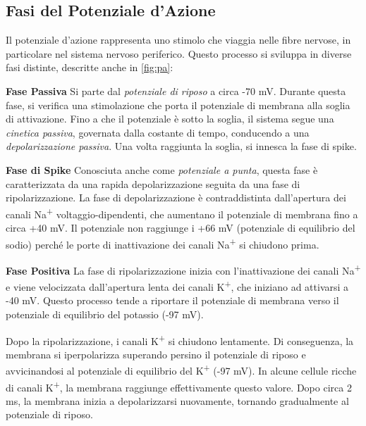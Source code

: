 \subsection{Fasi del Potenziale d’Azione}

Il potenziale d’azione rappresenta uno stimolo che viaggia nelle fibre nervose, in particolare nel sistema nervoso periferico. Questo processo si sviluppa in diverse fasi distinte, descritte anche in \autoref{fig:pa}:

\begin{description}
    \item \textbf{Fase Passiva} Si parte dal \textit{potenziale di riposo} a circa -70 mV. Durante questa fase, si verifica una stimolazione che porta il potenziale di membrana alla soglia di attivazione. Fino a che il potenziale è sotto la soglia, il sistema segue una \textit{cinetica passiva}, governata dalla costante di tempo, conducendo a una \textit{depolarizzazione passiva}. Una volta raggiunta la soglia, si innesca la {fase di spike}.
    
    \item \textbf{Fase di Spike} Conosciuta anche come \textit{potenziale a punta}, questa fase è caratterizzata da una rapida depolarizzazione seguita da una fase di ripolarizzazione. La fase di depolarizzazione è contraddistinta dall'apertura dei canali Na\textsuperscript{+} voltaggio-dipendenti, che aumentano il potenziale di membrana fino a circa +40 mV. Il potenziale non raggiunge i +66 mV (potenziale di equilibrio del sodio) perché le porte di inattivazione dei canali Na\textsuperscript{+} si chiudono prima.
    
    \item \textbf{Fase Positiva} La fase di ripolarizzazione inizia con l’inattivazione dei canali Na\textsuperscript{+} e viene velocizzata dall'apertura lenta dei canali K\textsuperscript{+}, che iniziano ad attivarsi a -40 mV. Questo processo tende a riportare il potenziale di membrana verso il potenziale di equilibrio del potassio (-97 mV).
    
    Dopo la ripolarizzazione, i canali K\textsuperscript{+} si chiudono lentamente. Di conseguenza, la membrana si iperpolarizza superando persino il potenziale di riposo e avvicinandosi al potenziale di equilibrio del K\textsuperscript{+} (-97 mV). In alcune cellule ricche di canali K\textsuperscript{+}, la membrana raggiunge effettivamente questo valore. Dopo circa 2 ms, la membrana inizia a depolarizzarsi nuovamente, tornando gradualmente al potenziale di riposo.
    

\end{description}
